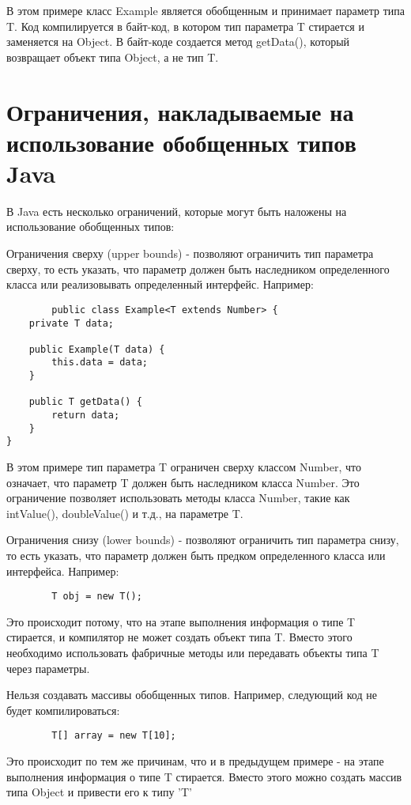 В этом примере класс Example является обобщенным и принимает параметр типа T. Код компилируется в байт-код, в котором тип параметра T стирается и заменяется на Object. В байт-коде создается метод getData(), который возвращает объект типа Object, а не тип T.

\section{Ограничения, накладываемые на использование обобщенных типов Java}
В Java есть несколько ограничений, которые могут быть наложены на использование обобщенных типов:

    Ограничения сверху (upper bounds) - позволяют ограничить тип параметра сверху, то есть указать, что параметр должен быть наследником определенного класса или реализовывать определенный интерфейс. Например:
    \begin{lstlisting}
        public class Example<T extends Number> {
    private T data;

    public Example(T data) {
        this.data = data;
    }

    public T getData() {
        return data;
    }
}
    \end{lstlisting}
В этом примере тип параметра T ограничен сверху классом Number, что означает, что параметр T должен быть наследником класса Number. Это ограничение позволяет использовать методы класса Number, такие как intValue(), doubleValue() и т.д., на параметре T.

    Ограничения снизу (lower bounds) - позволяют ограничить тип параметра снизу, то есть указать, что параметр должен быть предком определенного класса или интерфейса. Например:
    \begin{lstlisting}
        T obj = new T();
    \end{lstlisting}
Это происходит потому, что на этапе выполнения информация о типе T стирается, и компилятор не может создать объект типа T. Вместо этого необходимо использовать фабричные методы или передавать объекты типа T через параметры.

    Нельзя создавать массивы обобщенных типов. Например, следующий код не будет компилироваться:
    \begin{lstlisting}
        T[] array = new T[10];
    \end{lstlisting}
    Это происходит по тем же причинам, что и в предыдущем примере - на этапе выполнения информация о типе T стирается. Вместо этого можно создать массив типа Object и привести его к типу 'T'

